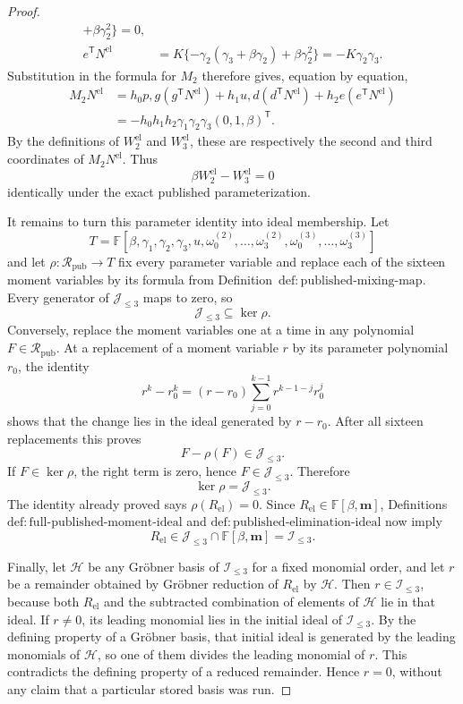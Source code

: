 \documentclass{article}
\begin{document}
\begin{proof}
\[\begin{aligned}
+\beta\gamma _2^2\}=0,\\
e^{\mathsf T}N^{\mathrm{el}}
&=K\{-\gamma _2(\gamma _3+\beta\gamma _2)+\beta\gamma _2^2\}
=-K\gamma _2\gamma _3.
\end{aligned}
\]
Substitution in the formula for \(M_2\) therefore gives, equation by equation,
\[
\begin{aligned}
M_2N^{\mathrm{el}}
&=h_0p,g(g^{\mathsf T}N^{\mathrm{el}})
+h_1u,d(d^{\mathsf T}N^{\mathrm{el}})
+h_2e(e^{\mathsf T}N^{\mathrm{el}})\\
&=-h_0h_1h_2\gamma _1\gamma _2\gamma _3(0,1,\beta)^{\mathsf T}.
\end{aligned}
\]
By the definitions of \(W_2^{\mathrm{el}}\) and \(W_3^{\mathrm{el}}\), these are respectively the second and third coordinates of \(M_2N^{\mathrm{el}}\).  Thus
\[
\beta W_2^{\mathrm{el}}-W_3^{\mathrm{el}}=0
\]
identically under the exact published parameterization.

It remains to turn this parameter identity into ideal membership.  Let
\[
T=\mathbb F[\beta,\gamma _1,\gamma _2,\gamma _3,u,
\omega_0^{(2)},\ldots,\omega_3^{(2)},
\omega_0^{(3)},\ldots,\omega_3^{(3)}]
\]
and let \(\rho:\mathcal R_{\mathrm{pub}}\to T\) fix every parameter variable and replace each of the sixteen moment variables by its formula from Definition~\(\mathrm{def{:}published\text{-}mixing\text{-}map}\).  Every generator of \(\mathcal J_{\leq3}\) maps to zero, so
\[
\mathcal J_{\leq3}\subseteq\ker\rho.
\]
Conversely, replace the moment variables one at a time in any polynomial \(F\in\mathcal R_{\mathrm{pub}}\).  At a replacement of a moment variable \(r\) by its parameter polynomial \(r_0\), the identity
\[
r^k-r_0^k=(r-r_0)\sum_{j=0}^{k-1}r^{k-1-j}r_0^j
\]
shows that the change lies in the ideal generated by \(r-r_0\).  After all sixteen replacements this proves
\[
F-\rho(F)\in\mathcal J_{\leq3}.
\]
If \(F\in\ker\rho\), the right term is zero, hence \(F\in\mathcal J_{\leq3}\).  Therefore
\[
\ker\rho=\mathcal J_{\leq3}.
\]
The identity already proved says \(\rho(R_{\mathrm{el}})=0\).  Since \(R_{\mathrm{el}}\in\mathbb F[\beta,\mathbf m]\), Definitions~\(\mathrm{def{:}full\text{-}published\text{-}moment\text{-}ideal}\) and \(\mathrm{def{:}published\text{-}elimination\text{-}ideal}\) now imply
\[
R_{\mathrm{el}}\in
\mathcal J_{\leq3}\cap\mathbb F[\beta,\mathbf m]
=\mathcal I_{\leq3}.
\]

Finally, let \(\mathcal H\) be any Gröbner basis of \(\mathcal I_{\leq3}\) for a fixed monomial order, and let \(r\) be a remainder obtained by Gröbner reduction of \(R_{\mathrm{el}}\) by \(\mathcal H\).  Then \(r\in\mathcal I_{\leq3}\), because both \(R_{\mathrm{el}}\) and the subtracted combination of elements of \(\mathcal H\) lie in that ideal.  If \(r\neq0\), its leading monomial lies in the initial ideal of \(\mathcal I_{\leq3}\).  By the defining property of a Gröbner basis, that initial ideal is generated by the leading monomials of \(\mathcal H\), so one of them divides the leading monomial of \(r\).  This contradicts the defining property of a reduced remainder.  Hence \(r=0\), without any claim that a particular stored basis was run.
\end{proof}
\end{document}
